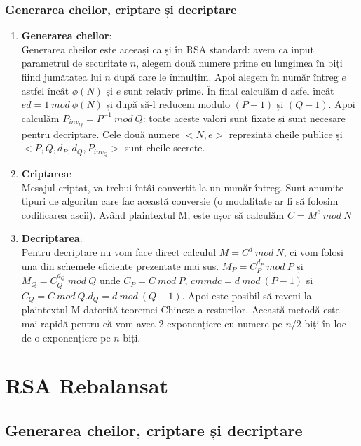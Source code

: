 \documentclass[12pt, oneside]{book}
\begin{document}
	  \subsubsection{Generarea cheilor, criptare și decriptare}
	  \begin{enumerate}
	    \item \textbf{Generarea cheilor}: \\
	    Generarea cheilor este aceeași ca și în RSA standard: avem ca input parametrul de securitate $n$, alegem două numere prime cu lungimea în biți fiind jumătatea lui $n$ după care le înmulțim. Apoi alegem în număr întreg $e$ astfel încât $ \phi(N) $ și $e$ sunt relativ prime. În final calculăm d asfel încât $ ed=1 \ mod \ \phi(N)$ și după să-l reducem modulo $(P-1)$ și $(Q-1)$. Apoi calculăm $P_{inv_Q} = P^{-1} \ mod \ Q$: toate aceste valori sunt fixate și sunt necesare pentru decriptare. Cele două numere $<N,e>$ reprezintă cheile publice și $<P,Q,d_P,d_Q,P_{inv_Q}>$ sunt cheile secrete.
	    
	    \item \textbf{ Criptarea}: \\
	    Mesajul criptat, va trebui întâi convertit la un număr întreg. Sunt anumite tipuri de algoritm care fac această conversie (o modalitate ar fi să folosim codificarea ascii). Având plaintextul M, este ușor să calculăm $C = M^e \ mod \ N$
	    
	    \item \textbf{Decriptarea}: \\
	    Pentru decriptare nu vom face direct calculul $M=C^d \ mod \ N$, ci vom folosi una din schemele eficiente prezentate mai sus. $M_P= C_{P}^{d_P} \ mod \ P$ și $M_Q = C_{Q}^{d_Q} \ mod \ Q $ unde $C_P = C \ mod \ P$, $cmmdc= d \ mod \ (P-1) $ și $C_Q = C \ mod \ Q. d_Q = d \ mod \ (Q-1) $. Apoi este posibil să reveni la plaintextul M datorită teoremei Chineze a resturilor. Această metodă este mai rapidă pentru că vom avea 2 exponențiere cu numere pe $n/2$ biți în loc de o exponențiere pe $n$ biți.
	  \end{enumerate}
	  
	  \section{RSA Rebalansat}
	   \subsection{Generarea cheilor, criptare și decriptare}
\end{document}
